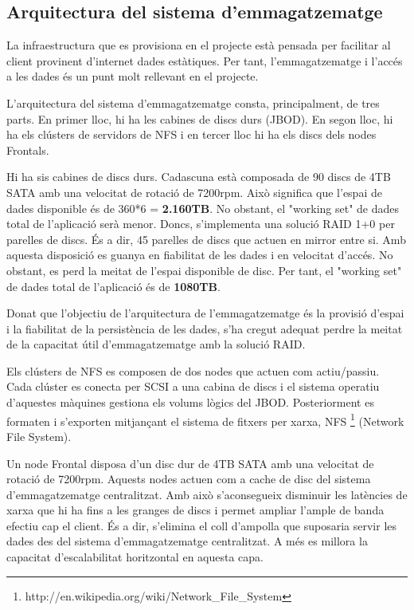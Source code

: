 \subsection{Arquitectura del sistema d’emmagatzematge}
\label{sec:arquitectura-emmagatzematge}

La infraestructura que es provisiona en el projecte està pensada per facilitar al client provinent d'internet dades estàtiques. Per tant, l'emmagatzematge i l'accés a les dades és un punt molt rellevant en el projecte. 

L'arquitectura del sistema d'emmagatzematge consta, principalment, de tres parts. En primer lloc, hi ha les cabines de discs durs (JBOD). En segon lloc, hi ha els clústers de servidors de NFS i en tercer lloc hi ha els discs dels nodes Frontals.

Hi ha sis cabines de discs durs. Cadascuna està composada de 90 discs de 4TB SATA amb una velocitat de rotació de 7200rpm. Això significa que l'espai de dades disponible és de 360*6 = \textbf{2.160TB}. No obstant, el "working set" de dades total de l'aplicació serà menor. Doncs, s'implementa una solució RAID 1+0 per parelles de discs. És a dir, 45 parelles de discs que actuen en mirror entre si. Amb aquesta disposició es guanya en fiabilitat de les dades i en velocitat d'accés. No obstant, es perd la meitat de l'espai disponible de disc. Per tant, el "working set" de dades total de l'aplicació és de \textbf{1080TB}.

Donat que l'objectiu de l'arquitectura de l'emmagatzematge és la provisió d'espai i la fiabilitat de la persistència de les dades, s'ha cregut adequat perdre la meitat de la capacitat útil d'emmagatzematge amb la solució RAID. 

Els clústers de NFS es composen de dos nodes que actuen com actiu/passiu. Cada clúster es conecta per SCSI a una cabina de discs i el sistema operatiu d'aquestes màquines gestiona els volums lògics del JBOD. Posteriorment es formaten i s'exporten mitjançant el sistema de fitxers per xarxa, NFS \footnote{http://en.wikipedia.org/wiki/Network\_File\_System} (Network File System).

Un node Frontal disposa d'un disc dur de 4TB SATA amb una velocitat de rotació de 7200rpm. Aquests nodes actuen com a cache de disc del sistema d'emmagatzematge centralitzat. Amb això s'aconsegueix disminuir les latències de xarxa que hi ha fins a les granges de discs i permet ampliar l'ample de banda efectiu cap el client. És a dir, s'elimina el coll d'ampolla que suposaria servir les dades des del sistema d'emmagatzematge centralitzat. A més es millora la capacitat d'escalabilitat horitzontal en aquesta capa. 

